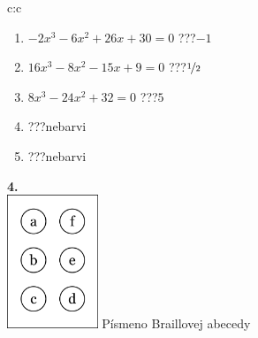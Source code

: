 \documentclass[10pt]{report}
\begin{document}
\begin{tabular}{c:c}
\begin{minipage}[c][104.5mm][t]{0.5\linewidth}
\begin{center}
\begin{minipage}{0.79\linewidth}
\begin{center}
\begin{varwidth}{\linewidth}
\begin{enumerate}
\item $-2x^3-6x^2+26x+30=0$\quad \dotfill\; ???\;\dotfill \quad $-1$
\item $16x^3-8x^2-15x+9=0$\quad \dotfill\; ???\;\dotfill \quad $\nicefrac{1}{2}$
\item $8x^3-24x^2+32=0$\quad \dotfill\; ???\;\dotfill \quad $5$
\item \quad \dotfill\; ???\;\dotfill \quad nebarvi
\item \quad \dotfill\; ???\;\dotfill \quad nebarvi
\end{enumerate}
\end{varwidth}
\end{center}
\end{minipage}
\begin{minipage}{0.20\linewidth}
\begin{center}
{\Huge\bfseries 4.} \\[2mm]
\includegraphics[height=40mm]{../images/braille.png}
{\small Písmeno Braillovej abecedy}
\end{center}
\end{minipage}
\end{center}
\end{minipage}
%
\end{tabular}
\newpage
\thispagestyle{empty}
\end{document}
